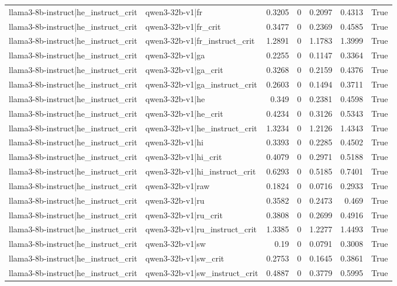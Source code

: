 \begin{table}
\begin{tabular}{l l r r r r l}
llama3-8b-instruct|he_instruct_crit & qwen3-32b-v1|fr & 0.3205 & 0 & 0.2097 & 0.4313 & True \\
llama3-8b-instruct|he_instruct_crit & qwen3-32b-v1|fr_crit & 0.3477 & 0 & 0.2369 & 0.4585 & True \\
llama3-8b-instruct|he_instruct_crit & qwen3-32b-v1|fr_instruct_crit & 1.2891 & 0 & 1.1783 & 1.3999 & True \\
llama3-8b-instruct|he_instruct_crit & qwen3-32b-v1|ga & 0.2255 & 0 & 0.1147 & 0.3364 & True \\
llama3-8b-instruct|he_instruct_crit & qwen3-32b-v1|ga_crit & 0.3268 & 0 & 0.2159 & 0.4376 & True \\
llama3-8b-instruct|he_instruct_crit & qwen3-32b-v1|ga_instruct_crit & 0.2603 & 0 & 0.1494 & 0.3711 & True \\
llama3-8b-instruct|he_instruct_crit & qwen3-32b-v1|he & 0.349 & 0 & 0.2381 & 0.4598 & True \\
llama3-8b-instruct|he_instruct_crit & qwen3-32b-v1|he_crit & 0.4234 & 0 & 0.3126 & 0.5343 & True \\
llama3-8b-instruct|he_instruct_crit & qwen3-32b-v1|he_instruct_crit & 1.3234 & 0 & 1.2126 & 1.4343 & True \\
llama3-8b-instruct|he_instruct_crit & qwen3-32b-v1|hi & 0.3393 & 0 & 0.2285 & 0.4502 & True \\
llama3-8b-instruct|he_instruct_crit & qwen3-32b-v1|hi_crit & 0.4079 & 0 & 0.2971 & 0.5188 & True \\
llama3-8b-instruct|he_instruct_crit & qwen3-32b-v1|hi_instruct_crit & 0.6293 & 0 & 0.5185 & 0.7401 & True \\
llama3-8b-instruct|he_instruct_crit & qwen3-32b-v1|raw & 0.1824 & 0 & 0.0716 & 0.2933 & True \\
llama3-8b-instruct|he_instruct_crit & qwen3-32b-v1|ru & 0.3582 & 0 & 0.2473 & 0.469 & True \\
llama3-8b-instruct|he_instruct_crit & qwen3-32b-v1|ru_crit & 0.3808 & 0 & 0.2699 & 0.4916 & True \\
llama3-8b-instruct|he_instruct_crit & qwen3-32b-v1|ru_instruct_crit & 1.3385 & 0 & 1.2277 & 1.4493 & True \\
llama3-8b-instruct|he_instruct_crit & qwen3-32b-v1|sw & 0.19 & 0 & 0.0791 & 0.3008 & True \\
llama3-8b-instruct|he_instruct_crit & qwen3-32b-v1|sw_crit & 0.2753 & 0 & 0.1645 & 0.3861 & True \\
llama3-8b-instruct|he_instruct_crit & qwen3-32b-v1|sw_instruct_crit & 0.4887 & 0 & 0.3779 & 0.5995 & True \\

\end{tabular}
\end{table}
